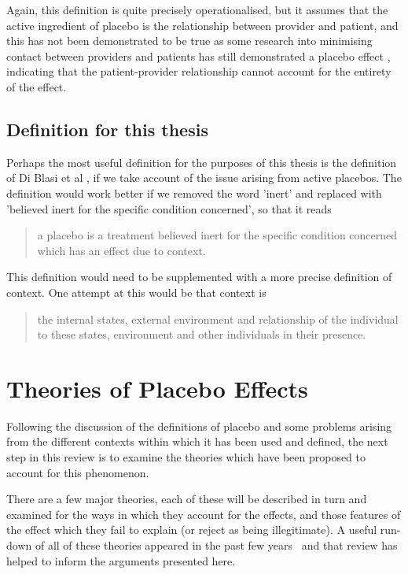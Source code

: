 Again, this definition is quite precisely operationalised, but it assumes that the active ingredient of placebo is the relationship between provider and patient, and this has not been demonstrated to be true as some research into minimising contact between providers and patients has still demonstrated a placebo effect \cite{Hyland2006}, indicating that the patient-provider relationship cannot account for the entirety of the effect.  



\subsection{Definition for this thesis}
\label{sec:defin-this-thes}


Perhaps the most useful definition for the purposes of this thesis is the definition of Di Blasi et al \cite{DiBlasi2001}, if we take account of the issue arising from active placebos. The definition would work better if we removed the word 'inert' and replaced with 'believed inert for the specific condition concerned', so that it reads

\begin{quotation}
  a placebo is a treatment believed inert for the specific condition
  concerned which has an effect due to context.
\end{quotation}

This definition would need to be supplemented with a more precise definition of context. One attempt at this would be that context is

\begin{quotation}
   the internal states, external environment and relationship of the individual to these states, environment and other individuals in their presence.
\end{quotation}





\section{Theories of Placebo Effects}
\label{sec:theor-plac-effects}

Following the discussion of the definitions of placebo and some problems arising from the different contexts within which it has been used and defined, the next step in this review is to examine the theories which have been proposed to account for this phenomenon. 

There are a few major theories, each of these will be described in turn  and examined for the ways in which they account for the effects, and those features of the effect which they fail to explain (or reject as being illegitimate). A useful run-down of all of these theories appeared in the past few years~\cite{Stewart-Williams2004b} and that review has helped to inform the arguments presented here. 

